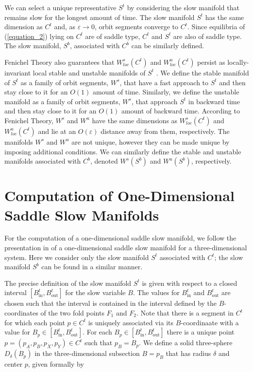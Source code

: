 \documentclass{ws-ijbc}
\begin{document}
We can select a unique representative $S^t$ by considering the slow manifold that remains slow for the longest amount of time.  The slow manifold $S^t$ has the same dimension as $C^t$ and, as $\varepsilon \rightarrow 0$, orbit segments converge to $C^t$.  Since equilibria of (\ref{equation_2}) lying on $C^t$ are of saddle type, $C^t$ and $S^t$ are also of saddle type.  The slow manifold, $S^b$, associated with $C^b$ can be similarly defined.
    
Fenichel Theory also guarantees that $W^{s}_{loc}(C^t)$ and $W^{u}_{loc}(C^t)$ persist as locally-invariant local stable and unstable manifolds of $S^t$ \cite{Fenichel}.  We define the stable manifold of $S^t$ as a family of orbit segments, $W^s$, that have a fast approach to $S^t$ and then stay close to it for an $O(1)$ amount of time.  Similarly, we define the unstable manifold as a family of orbit segments, $W^s$, that approach $S^t$ in backward time and then stay close to it for an $O(1)$ amount of backward time.  According to Fenichel Theory, $W^s$ and $W^u$ have the same dimensions as $W^{s}_{loc}(C^t)$ and $W^{u}_{loc}(C^t)$ and lie at an $O(\varepsilon)$ distance away from them, respectively.  The manifolds $W^s$ and $W^u$ are not unique, however they can be made unique by imposing additional conditions.   We can similarly define the stable and unstable manifolds associated with $C^b$, denoted $W^s(S^b)$ and $W^u(S^b)$, respectively.
 
 
 \section{Computation of One-Dimensional Saddle Slow Manifolds}
    
For the computation of a one-dimensional saddle slow manifold, we follow the presentation in \cite{Saeed_Paper} of a one-dimensional saddle slow manifold for a three-dimensional system.  Here we consider only the slow manifold $S^t$ associated with $C^t$; the slow manifold $S^b$ can be found in a similar manner.
    
The precise definition of the slow manifold $S^t$ is given with respect to a closed interval $[B^t_{\mathrm{in}},B^t_{\mathrm{out}}]$ for the slow variable $B$.  The values for $B^t_{\mathrm{in}}$ and $B^t_{\mathrm{out}}$ are chosen such that the interval is contained in the interval defined by the $B$-coordinates of the two fold points $F_1$ and $F_2$.  Note that there is a segment in $C^t$ for which each point $p \in C^t$ is uniquely associated via its $B$-coordinaate with a value for $B_p \in [B^t_{\mathrm{in}},B^t_{\mathrm{out}}]$.  For each $B_p \in [B^t_{\mathrm{in}},B^t_{\mathrm{out}}]$ there is a unique point $p=(p_A,p_B,p_X,p_Y) \in C^t$ such that $p_B = B_p$.  We define a solid three-sphere $D_\delta(B_p)$ in the three-dimensional subsection $B=p_B$ that has radius $\delta$ and center $p$, given formally by
\end{document}
